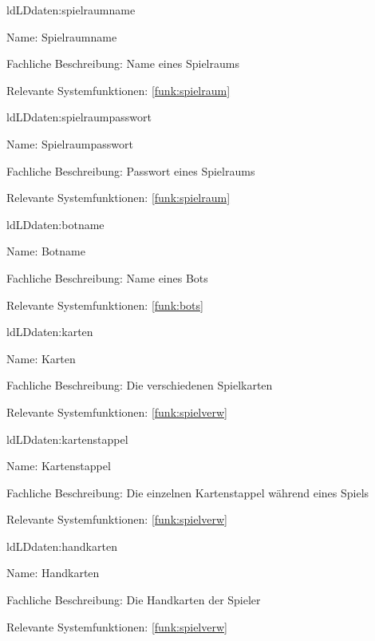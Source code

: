 \begin{description}[leftmargin=5em, style=sameline]
	\begin{lhp}{ld}{LD}{daten:spielraumname}
		\item [Name:] Spielraumname
		\item [Fachliche Beschreibung:] Name eines Spielraums
		\item [Relevante Systemfunktionen:] \ref{funk:spielraum}
	\end{lhp}
	
	\begin{lhp}{ld}{LD}{daten:spielraumpasswort}
		\item [Name:] Spielraumpasswort
		\item [Fachliche Beschreibung:] Passwort eines Spielraums
		\item [Relevante Systemfunktionen:] \ref{funk:spielraum}
	\end{lhp}
	
	\begin{lhp}{ld}{LD}{daten:botname}
		\item [Name:] Botname
		\item [Fachliche Beschreibung:] Name eines Bots
		\item [Relevante Systemfunktionen:] \ref{funk:bots}
	\end{lhp}
	
	\begin{lhp}{ld}{LD}{daten:karten}
		\item [Name:] Karten
		\item [Fachliche Beschreibung:] Die verschiedenen Spielkarten
		\item [Relevante Systemfunktionen:] \ref{funk:spielverw}
	\end{lhp}
	
	\begin{lhp}{ld}{LD}{daten:kartenstappel}
		\item [Name:] Kartenstappel
		\item [Fachliche Beschreibung:] Die einzelnen Kartenstappel während eines Spiels
		\item [Relevante Systemfunktionen:] \ref{funk:spielverw}
	\end{lhp}
	
	\begin{lhp}{ld}{LD}{daten:handkarten}
		\item [Name:] Handkarten
		\item [Fachliche Beschreibung:] Die Handkarten der Spieler
		\item [Relevante Systemfunktionen:] \ref{funk:spielverw}
	\end{lhp}
\end{description}